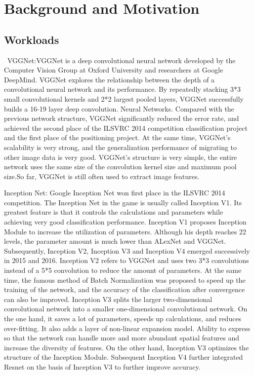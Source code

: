 \section{Background and Motivation}
\subsection{Workloads}
\ VGGNet:VGGNet is a deep convolutional neural network developed by the Computer Vision Group at Oxford University and researchers at Google DeepMind. VGGNet explores the relationship between the depth of a convolutional neural network and its performance. By repeatedly stacking 3*3 small convolutional kernels and 2*2 largest pooled layers, VGGNet successfully builds a 16-19 layer deep convolution.\cite{simonyan2014very} Neural Networks. Compared with the previous network structure, VGGNet significantly reduced the error rate, and achieved the second place of the ILSVRC 2014 competition classification project and the first place of the positioning project. At the same time, VGGNet's scalability is very strong, and the generalization performance of migrating to other image data is very good. VGGNet's structure is very simple, the entire network uses the same size of the convolution kernel size and maximum pool size.So far, VGGNet is still often used to extract image features.


Inception Net: Google Inception Net won first place in the ILSVRC 2014 competition. The Inception Net in the game is usually called Inception V1. Its greatest feature is that it controls the calculations and parameters while achieving very good classification performance. Inception V1 proposes Inception Module to increase the utilization of parameters. Although his depth reaches 22 levels, the parameter amount is much lower than ALexNet and VGGNet. Subsequently, Inception V2, Inception V3 and Inception V4 emerged successively in 2015 and 2016. Inception V2 refers to VGGNet and uses two 3*3 convolutions instead of a 5*5 convolution to reduce the amount of parameters. At the same time, the famous method of Batch Normalization was proposed to speed up the training of the network, and the accuracy of the classification after convergence can also be improved. Inception V3 splits the larger two-dimensional convolutional network into a smaller one-dimensional convolutional network. On the one hand, it saves a lot of parameters, speeds up calculations, and reduces over-fitting. It also adds a layer of non-linear expansion model. Ability to express so that the network can handle more and more abundant spatial features and increase the diversity of features. On the other hand, Inception V3 optimizes the structure of the Inception Module. Subsequent Inception V4 further integrated Resnet on the basis of Inception V3 to further improve accuracy.


